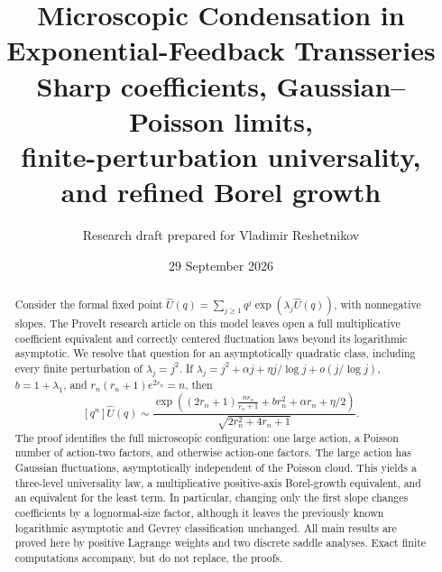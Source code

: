 \documentclass[11pt,a4paper]{article}
\title{\textbf{Microscopic Condensation in\\Exponential-Feedback Transseries}\\[7pt]
\large Sharp coefficients, Gaussian--Poisson limits,\\finite-perturbation universality, and refined Borel growth}
\author{Research draft prepared for Vladimir Reshetnikov}
\date{29 September 2026}
\theoremstyle{definition}
\newcommand{\U}{\widehat U}
\numberwithin{equation}{section}
\begin{document}
\maketitle
\begin{abstract}
Consider the formal fixed point
\(\U(q)=\sum_{j\ge1}q^j\exp(\lambda_j\U(q))\), with nonnegative slopes.
The ProveIt research article on this model leaves open a full multiplicative
coefficient equivalent and correctly centered fluctuation laws beyond its
logarithmic asymptotic. We resolve that question for an asymptotically quadratic
class, including every finite perturbation of \(\lambda_j=j^2\).
If
\(\lambda_j=j^2+\alpha j+\eta j/\log j+o(j/\log j)\),
\(b=1+\lambda_1\), and \(r_n(r_n+1)e^{2r_n}=n\), then
\[
 [q^n]\U(q)\sim
 \frac{\exp\!\left((2r_n+1)\frac{nr_n}{r_n+1}
                 +br_n^2+\alpha r_n+\eta/2\right)}
      {\sqrt{2r_n^2+4r_n+1}}.
\]
The proof identifies the full microscopic configuration: one large action,
a Poisson number of action-two factors, and otherwise action-one factors.
The large action has Gaussian fluctuations, asymptotically independent of the
Poisson cloud. This yields a three-level universality law, a multiplicative
positive-axis Borel-growth equivalent, and an equivalent for the least term.
In particular, changing only the first slope changes coefficients by a
lognormal-size factor, although it leaves the previously known logarithmic
asymptotic and Gevrey classification unchanged. All main results are proved
here by positive Lagrange weights and two discrete saddle analyses. Exact
finite computations accompany, but do not replace, the proofs.
\end{abstract}
\end{document}
